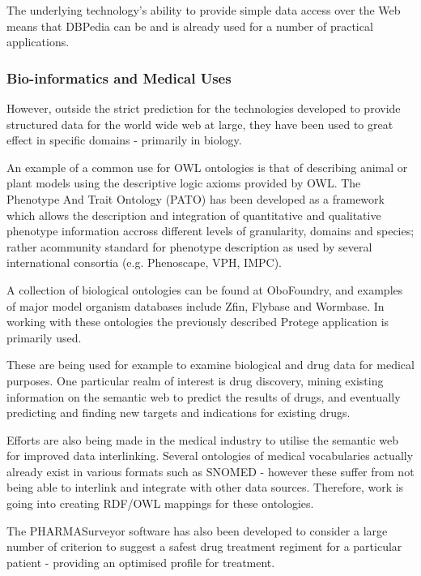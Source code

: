 \documentclass{article}
\begin{document}
The underlying technology's ability to provide simple data access over the Web
means that DBPedia can be and is already used for a number of practical
applications.\cite{dbpedia-uses}

\subsubsection{Bio-informatics and Medical Uses}

However, outside the strict prediction for the technologies developed to provide
structured data for the world wide web at large, they have been used to great
effect in specific domains - primarily in biology.

An example of a common use for OWL ontologies is that of describing animal or
plant models using the descriptive logic axioms provided by OWL. The Phenotype
And Trait Ontology (PATO) has been developed as a framework which allows the
description and integration of quantitative and qualitative phenotype
information accross different levels of granularity, domains and
species\cite{pato}; rather acommunity standard for phenotype description as
used by several international consortia (e.g. Phenoscape\cite{phenoscape},
VPH\cite{vph}, IMPC\cite{impc}).

A collection of biological ontologies can be found at
OboFoundry\cite{obofoundry}, and examples of major model organism databases
include Zfin\cite{zfin}, Flybase\cite{flybase} and Wormbase\cite{wormbase}. In working with
these ontologies the previously described Protege application is primarily used. 

These are being used for example to examine biological and drug data for medical
purposes\cite{humontology}. One particular realm of interest is drug discovery,
mining existing information on the semantic web to predict the results of drugs,
and eventually predicting and finding new targets and indications for existing
drugs\cite{semwebdiscovery}.

Efforts are also being made in the medical industry to utilise the semantic web
for improved data interlinking. Several ontologies of medical vocabularies actually
already exist in various formats such as SNOMED\cite{snomed2} - however these suffer from not
being able to interlink and integrate with other data sources. Therefore, work
is going into creating RDF/OWL mappings for these
ontologies.\cite{snomed1} 

The PHARMASurveyor software has also been developed to consider a large number
of criterion to suggest a safest drug treatment regiment for a particular
patient - providing an optimised profile for treatment.\cite{psurveyor} 
\end{document}
